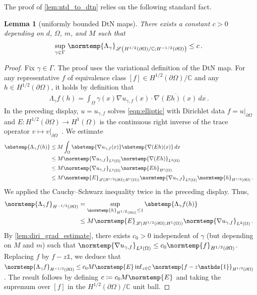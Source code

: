 \documentclass[pdflatex,sn-mathphys-num]{sn-jnl-preprint}
\let\originalleft\left %
\let\originalright\right
\renewcommand{\left}{\mathopen{}\mathclose\bgroup\originalleft}
\renewcommand{\right}{\aftergroup\egroup\originalright}
\newcommand{\C}{\mathbb{C}}
\newcommand{\sL}{\mathscr{L}}
\newcommand{\pOmega}{{\partial\Omega}}
\newcommand{\dtn}{\Lambda_{\gamma}}
\newcommand{\norm}{\normtemp}
\newcommand{\abs}{\abstemp}
\newcommand{\defeq}{\coloneqq} %
\newcommand{\diff}{d}
\newcommand{\dd}[1]{\,\diff{#1}}
\newcommand{\onebm}{\mathds{1}} %
\theoremstyle{thmstyleone}%
\newtheorem{lemma}[theorem]{Lemma}%
\theoremstyle{thmstyletwo}%
\theoremstyle{thmstylethree}%
\numberwithin{equation}{section}
\numberwithin{theorem}{section}
\begin{document}
\begin{appendices}
The proof of \cref{lem:ntd_to_dtn} relies on the following standard fact.
\begin{lemma}[uniformly bounded DtN maps]\label{lem:dtn_uniform}
    There exists a constant $c>0$ depending on $d$, $\Omega$, $m$, and $M$ such that
    \begin{align}\label{eqn:dtn_uniform}
        \sup_{\gamma\in\Gamma}\,\norm{\dtn}_{\sL\left(H^{1/2}(\pOmega)/\C;H^{-1/2}(\pOmega)\right)}\leq c\,.
    \end{align}
\end{lemma}
\begin{proof}
    Fix $\gamma\in\Gamma$. The proof uses the variational definition of the DtN map. For any representative $f$ of equivalence class $[f]\in H^{1/2}(\pOmega)/\C$ and any $h\in H^{1/2}(\pOmega)$, it holds by definition that
    \begin{align*}
        \dtn f(h)= \int_\Omega \gamma(x)\nabla u_{\gamma,f}(x) \cdot \overline{\nabla (Eh)(x)} \dd{x}\,.
    \end{align*}
    In the preceding display, $u=u_{\gamma,f}$ solves \eqref{eqn:elliptic} with Dirichlet data $f=u|_{\pOmega}$ and $E\colon H^{1/2}(\pOmega)\to H^1(\Omega)$ is the continuous right inverse of the trace operator $v\mapsto v|_{\partial\Omega}$~\cite[Thm.~8.3, p.~39]{lions2012non}. We estimate
    \begin{align*}
        \abs{\dtn f(h)}&\leq M\int_\Omega \abs{\nabla u_{\gamma,f}(x)}\abs{\nabla(Eh)(x)}\dd{x}\\
        &\leq  M\norm{\nabla u_{\gamma,f}}_{L^2(\Omega)}\norm{\nabla (Eh)}_{L^2(\Omega)}\\
        &\leq M\norm{\nabla u_{\gamma,f}}_{L^2(\Omega)}\norm{Eh}_{H^1(\Omega)}\\
        &\leq M\norm{E}_{\sL(H^{1/2}(\pOmega);H^1(\Omega))}\norm{\nabla u_{\gamma,f}}_{L^2(\Omega)}\norm{h}_{H^{1/2}(\pOmega)}\,.
    \end{align*}
    We applied the Cauchy--Schwarz inequality twice in the preceding display. Thus,
    \begin{align*}
        \norm{\dtn f}_{H^{-1/2}(\pOmega)} &= \sup_{\norm{h}_{H^{1/2}(\pOmega)}\leq 1} \abs{\dtn f(h)}\\
        &\leq M\norm{E}_{\sL(H^{1/2}(\pOmega);H^1(\Omega))}\norm{\nabla u_{\gamma,f}}_{L^2(\Omega)}\,.
    \end{align*}
    By \cref{lem:diri_grad_estimate}, there exists $c_0>0$ independent of $\gamma$ (but depending on $M$ and $m$) such that $\norm{\nabla u_{\gamma,f}}_{L^2(\Omega)}\leq c_0 \norm{f}_{H^{1/2}(\pOmega)}$. Replacing $f$ by $f-z\onebm$, we deduce that $\norm{\dtn f}_{H^{-1/2}(\pOmega)}\leq c_0M\norm{E}\inf_{z\in\C}\norm{f-z\onebm}_{H^{1/2}(\pOmega)}$.
    The result follows by defining $c\defeq c_0M\norm{E}$ and taking the supremum over $[f]$ in the $H^{1/2}(\pOmega)/\C$ unit ball.
\end{proof}


\end{appendices}
\end{document}
